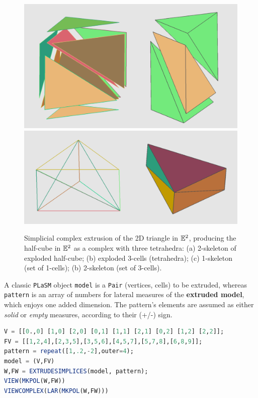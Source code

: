 \documentclass{juliacon}
\begin{document}
\begin{figure}[htbp] %
\includegraphics[width=0.5\linewidth]{figs/simplex-extrude}%
\includegraphics[width=0.5\linewidth,height=0.293\linewidth]{figs/half-cube-sk}
		\caption{Simplicial complex extrusion of the 2D triangle in $\mathbb{E}^2$, producing the half-cube in $\mathbb{E}^2$ as a complex with three tetrahedra: (a) 2-skeleton of exploded half-cube; (b) exploded 3-cells (tetrahedra);
(c) 1-skeleton (set of 1-cells); (b) 2-skeleton (set of 3-cells).}
\label{fig:tetgen2}
\end{figure}

A classic {\tt PLaSM} object {\tt model} is a {\tt Pair} (vertices, cells) to be extruded, whereas {\tt pattern} is an array of numbers for lateral measures of the \textbf{extruded model}, which enjoys one added dimension. The pattern’s elements are assumed as either \emph{solid} or \emph{empty} measures, according to their (+/-) sign.


\begin{lstlisting}[language = Julia,numbers=none,label={lst:exmpl9},
caption={Multiple Hpc model extrusion.}
]
V = [[0.,0] [1,0] [2,0] [0,1] [1,1] [2,1] [0,2] [1,2] [2,2]];
FV = [[1,2,4],[2,3,5],[3,5,6],[4,5,7],[5,7,8],[6,8,9]];
pattern = repeat([1,.2,-2],outer=4);
model = (V,FV)
W,FW = EXTRUDESIMPLICES(model, pattern);
VIEW(MKPOL(W,FW))
VIEWCOMPLEX(LAR(MKPOL(W,FW)))
\end{lstlisting}
\end{document}
